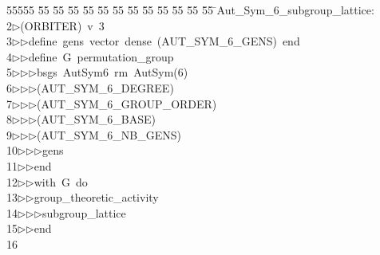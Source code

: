 %
%
\begin{tabbing}
55555 \= 55 \= 55 \= 55 \= 55 \= 55 \= 55 \= 55 \= 55 \= 55 \= 55 \= 55 \= 55 \= \>Aut\_Sym\_6\_subgroup\_lattice:\\[0pt]
2\>$\triangleright$\>(ORBITER)\ v\ 3\ \\[0pt]
3\>$\triangleright$\>$\triangleright$\>define\ gens\ vector\ dense\ (AUT\_SYM\_6\_GENS)\ end\ \\[0pt]
4\>$\triangleright$\>$\triangleright$\>define\ G\ permutation\_group\ \\[0pt]
5\>$\triangleright$\>$\triangleright$\>$\triangleright$\>bsgs\ AutSym6\ rm\ AutSym(6)\ \\[0pt]
6\>$\triangleright$\>$\triangleright$\>$\triangleright$\>(AUT\_SYM\_6\_DEGREE)\ \\[0pt]
7\>$\triangleright$\>$\triangleright$\>$\triangleright$\>(AUT\_SYM\_6\_GROUP\_ORDER)\ \\[0pt]
8\>$\triangleright$\>$\triangleright$\>$\triangleright$\>(AUT\_SYM\_6\_BASE)\ \\[0pt]
9\>$\triangleright$\>$\triangleright$\>$\triangleright$\>(AUT\_SYM\_6\_NB\_GENS)\ \\[0pt]
10\>$\triangleright$\>$\triangleright$\>$\triangleright$\>gens\ \\[0pt]
11\>$\triangleright$\>$\triangleright$\>end\ \\[0pt]
12\>$\triangleright$\>$\triangleright$\>with\ G\ do\ \\[0pt]
13\>$\triangleright$\>$\triangleright$\>group\_theoretic\_activity\ \\[0pt]
14\>$\triangleright$\>$\triangleright$\>$\triangleright$\>subgroup\_lattice\ \\[0pt]
15\>$\triangleright$\>$\triangleright$\>end\\[0pt]
16\>\end{tabbing}
